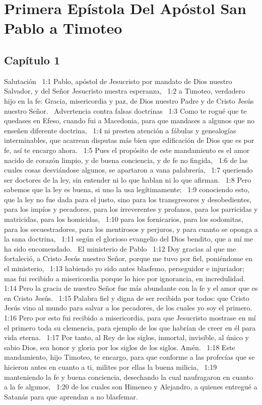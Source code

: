 \chapter{Primera Epístola Del Apóstol San Pablo a Timoteo}




\section*{Capítulo 1}
Salutación  
1:1 Pablo, apóstol de Jesucristo por mandato de Dios nuestro Salvador, y del Señor Jesucristo nuestra esperanza,  
1:2 a Timoteo, verdadero hijo en la fe: Gracia, misericordia y paz, de Dios nuestro Padre y de Cristo Jesús nuestro Señor.  
Advertencia contra falsas doctrinas  
1:3 Como te rogué que te quedases en Efeso, cuando fui a Macedonia, para que mandases a algunos que no enseñen diferente doctrina,  
1:4 ni presten atención a fábulas y genealogías interminables, que acarrean disputas más bien que edificación de Dios que es por fe, así te encargo ahora.  
1:5 Pues el propósito de este mandamiento es el amor nacido de corazón limpio, y de buena conciencia, y de fe no fingida,  
1:6 de las cuales cosas desviándose algunos, se apartaron a vana palabrería,  
1:7 queriendo ser doctores de la ley, sin entender ni lo que hablan ni lo que afirman.  
1:8 Pero sabemos que la ley es buena, si uno la usa legítimamente;  
1:9 conociendo esto, que la ley no fue dada para el justo, sino para los transgresores y desobedientes, para los impíos y pecadores, para los irreverentes y profanos, para los parricidas y matricidas, para los homicidas,  
1:10 para los fornicarios, para los sodomitas, para los secuestradores, para los mentirosos y perjuros, y para cuanto se oponga a la sana doctrina,  
1:11 según el glorioso evangelio del Dios bendito, que a mí me ha sido encomendado.  
El ministerio de Pablo  
1:12 Doy gracias al que me fortaleció, a Cristo Jesús nuestro Señor, porque me tuvo por fiel, poniéndome en el ministerio,  
1:13 habiendo yo sido antes blasfemo, perseguidor e injuriador; mas fui recibido a misericordia porque lo hice por ignorancia, en incredulidad.  
1:14 Pero la gracia de nuestro Señor fue más abundante con la fe y el amor que es en Cristo Jesús.  
1:15 Palabra fiel y digna de ser recibida por todos: que Cristo Jesús vino al mundo para salvar a los pecadores, de los cuales yo soy el primero.  
1:16 Pero por esto fui recibido a misericordia, para que Jesucristo mostrase en mí el primero toda su clemencia, para ejemplo de los que habrían de creer en él para vida eterna.  
1:17 Por tanto, al Rey de los siglos, inmortal, invisible, al único y sabio Dios, sea honor y gloria por los siglos de los siglos. Amén.  
1:18 Este mandamiento, hijo Timoteo, te encargo, para que conforme a las profecías que se hicieron antes en cuanto a ti, milites por ellas la buena milicia,  
1:19 manteniendo la fe y buena conciencia, desechando la cual naufragaron en cuanto a la fe algunos,  
1:20 de los cuales son Himeneo y Alejandro, a quienes entregué a Satanás para que aprendan a no blasfemar.  
